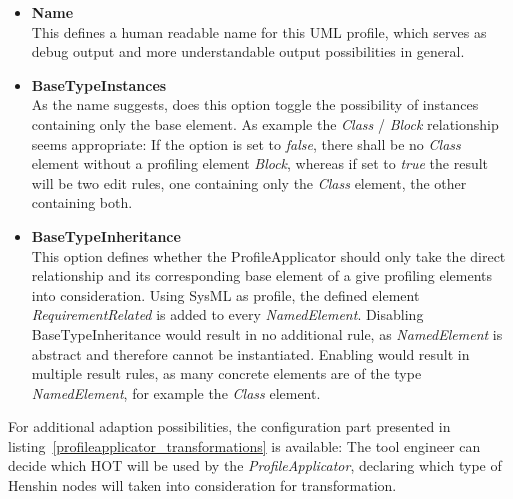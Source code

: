 \begin{itemize}
  \item \textbf{Name} \\
  		This defines a human readable name for this \ac{UML} profile, which serves
  		as debug output and more understandable output possibilities in general.
  \item \textbf{BaseTypeInstances} \\
  		As the name suggests, does this option toggle the possibility of instances 
  		containing only the base element. As example the \textit{Class} /
  		\textit{Block} relationship seems appropriate: If the option is set to
  		\textit{false}, there shall be no \textit{Class} element without a profiling element \textit{Block}, whereas if set
  		to \textit{true} the result will be two edit rules, one containing only the
  		\textit{Class} element, the other containing both.
  \item \textbf{BaseTypeInheritance} \\
  		This option defines whether the ProfileApplicator should only take the
  		direct relationship and its corresponding base element of a give profiling
  		elements into consideration. Using \ac{SysML} as profile, the defined
  		element \textit{RequirementRelated} is added to every \textit{NamedElement}.
  		Disabling BaseTypeInheritance would result in no additional rule, as
  		\textit{NamedElement} is abstract and therefore cannot be instantiated. Enabling
  		would result in multiple result rules, as many concrete elements are of the
  		type \textit{NamedElement}, for example the \textit{Class} element.
\end{itemize}

For additional adaption possibilities, the configuration part presented in
listing~\ref{profileapplicator_transformations} is available: The tool engineer
can decide which \ac{HOT} will be used by the \textit{ProfileApplicator},
declaring which type of Henshin nodes will taken into consideration for transformation.
\newpage


